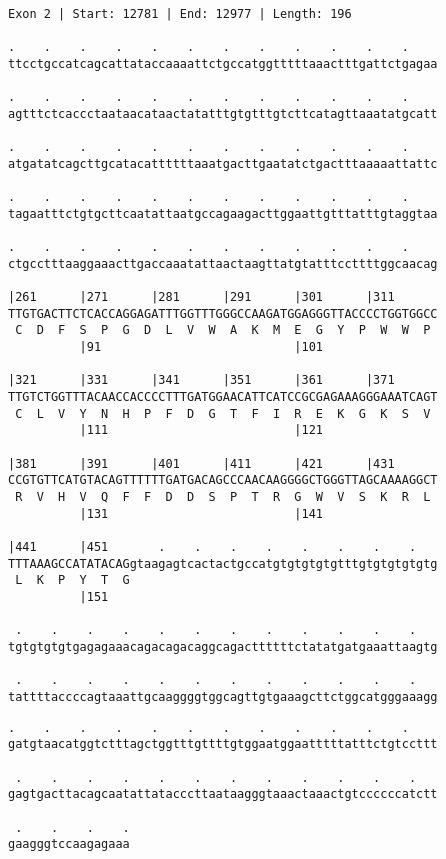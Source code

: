\documentclass{article}
\begin{document}
\begin{Verbatim}[fontfamily=courier]
Exon 2 | Start: 12781 | End: 12977 | Length: 196

.    .    .    .    .    .    .    .    .    .    .    .    
ttcctgccatcagcattataccaaaattctgccatggtttttaaactttgattctgagaa

.    .    .    .    .    .    .    .    .    .    .    .    
agtttctcaccctaataacataactatatttgtgtttgtcttcatagttaaatatgcatt

.    .    .    .    .    .    .    .    .    .    .    .    
atgatatcagcttgcatacattttttaaatgacttgaatatctgactttaaaaattattc

.    .    .    .    .    .    .    .    .    .    .    .    
tagaatttctgtgcttcaatattaatgccagaagacttggaattgtttatttgtaggtaa

.    .    .    .    .    .    .    .    .    .    .    .    
ctgcctttaaggaaacttgaccaaatattaactaagttatgtatttccttttggcaacag

|261      |271      |281      |291      |301      |311      
TTGTGACTTCTCACCAGGAGATTTGGTTTGGGCCAAGATGGAGGGTTACCCCTGGTGGCC
 C  D  F  S  P  G  D  L  V  W  A  K  M  E  G  Y  P  W  W  P 
          |91                           |101                

|321      |331      |341      |351      |361      |371      
TTGTCTGGTTTACAACCACCCCTTTGATGGAACATTCATCCGCGAGAAAGGGAAATCAGT
 C  L  V  Y  N  H  P  F  D  G  T  F  I  R  E  K  G  K  S  V 
          |111                          |121                

|381      |391      |401      |411      |421      |431      
CCGTGTTCATGTACAGTTTTTTGATGACAGCCCAACAAGGGGCTGGGTTAGCAAAAGGCT
 R  V  H  V  Q  F  F  D  D  S  P  T  R  G  W  V  S  K  R  L 
          |131                          |141                

|441      |451       .    .    .    .    .    .    .    .   
TTTAAAGCCATATACAGgtaagagtcactactgccatgtgtgtgtgtttgtgtgtgtgtg
 L  K  P  Y  T  G                                           
          |151                                              

 .    .    .    .    .    .    .    .    .    .    .    .   
tgtgtgtgtgagagaaacagacagacaggcagacttttttctatatgatgaaattaagtg

 .    .    .    .    .    .    .    .    .    .    .    .   
tattttaccccagtaaattgcaaggggtggcagttgtgaaagcttctggcatgggaaagg

\end{Verbatim}
\newpage
\begin{Verbatim}[fontfamily=courier]
 .    .    .    .    .    .    .    .    .    .    .    .   
gatgtaacatggtctttagctggtttgttttgtggaatggaatttttatttctgtccttt

 .    .    .    .    .    .    .    .    .    .    .    .   
gagtgacttacagcaatattatacccttaataagggtaaactaaactgtccccccatctt

 .    .    .    .
gaagggtccaagagaaa
\end{Verbatim}
\end{document}
